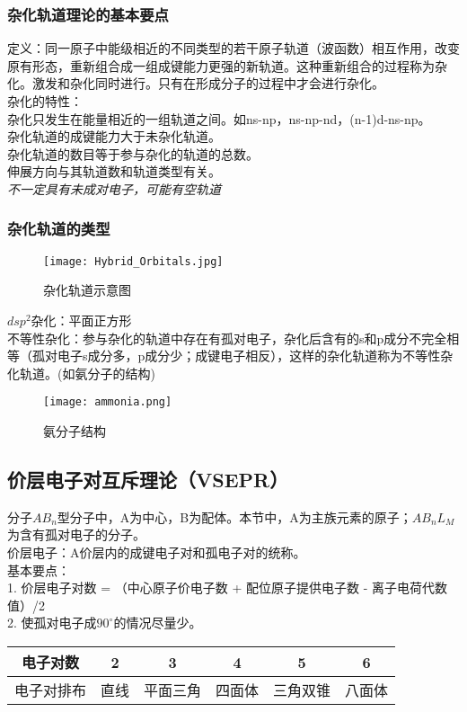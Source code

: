 \documentclass[utf8,a4paper,12pt]{ctexart}
\begin{document}
\subsubsection{杂化轨道理论的基本要点}
定义：同一原子中能级相近的不同类型的若干原子轨道（波函数）相互作用，改变原有形态，重新组合成一组成键能力更强的新轨道。这种重新组合的过程称为杂化。激发和杂化同时进行。只有在形成分子的过程中才会进行杂化。\\
杂化的特性：\\
杂化只发生在能量相近的一组轨道之间。如ns-np，ns-np-nd，(n-1)d-ns-np。\\
杂化轨道的成键能力大于未杂化轨道。\\
杂化轨道的数目等于参与杂化的轨道的总数。\\
伸展方向与其轨道数和轨道类型有关。\\
\emph{不一定具有未成对电子，可能有空轨道}
\subsubsection{杂化轨道的类型}
\begin{figure}[H]
\centering
\texttt{[image: Hybrid\_Orbitals.jpg]}
\caption{杂化轨道示意图}
\end{figure}
$dsp^2$杂化：平面正方形\\
不等性杂化：参与杂化的轨道中存在有孤对电子，杂化后含有的s和p成分不完全相等（孤对电子s成分多，p成分少；成键电子相反），这样的杂化轨道称为不等性杂化轨道。(如氨分子的结构)\\
\begin{figure}[H]
\centering
\texttt{[image: ammonia.png]}
\caption{氨分子结构}
\end{figure}
\subsection{价层电子对互斥理论（VSEPR）}
分子$AB_n$型分子中，A为中心，B为配体。本节中，A为主族元素的原子；$AB_nL_M$为含有孤对电子的分子。\\
价层电子：A价层内的成键电子对和孤电子对的统称。\\
基本要点：\\
1. 价层电子对数 = （中心原子价电子数 + 配位原子提供电子数 - 离子电荷代数值）/2\\
2. 使孤对电子成$90^{\circ}$的情况尽量少。
\begin{table}[H]
\centering
\begin{tabular}{c|ccccc}
\toprule
电子对数&2&3&4&5&6\\
\hline
电子对排布&直线&平面三角&四面体&三角双锥&八面体\\
\bottomrule
\end{tabular}
\end{table}
\end{document}
